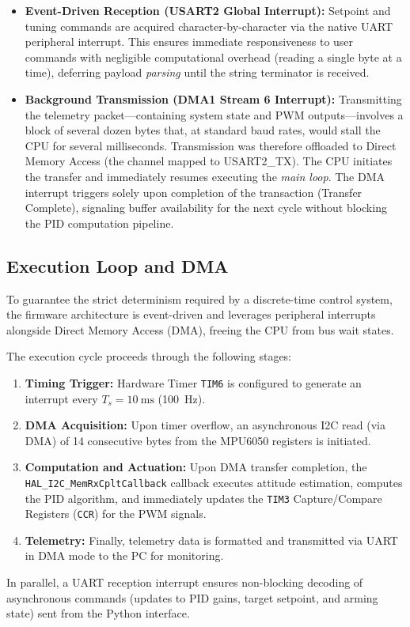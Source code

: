 \documentclass[11pt, a4paper]{article}
\begin{document}
\begin{itemize}
    \item \textbf{Event-Driven Reception (USART2 Global Interrupt):} Setpoint and tuning commands are acquired character-by-character via the native UART peripheral interrupt. This ensures immediate responsiveness to user commands with negligible computational overhead (reading a single byte at a time), deferring payload \textit{parsing} until the string terminator is received.
    \item \textbf{Background Transmission (DMA1 Stream 6 Interrupt):} Transmitting the telemetry packet—containing system state and PWM outputs—involves a block of several dozen bytes that, at standard baud rates, would stall the CPU for several milliseconds. Transmission was therefore offloaded to Direct Memory Access (the channel mapped to USART2\_TX). The CPU initiates the transfer and immediately resumes executing the \textit{main loop}. The DMA interrupt triggers solely upon completion of the transaction (Transfer Complete), signaling buffer availability for the next cycle without blocking the PID computation pipeline.
\end{itemize}

\subsection{Execution Loop and DMA}
To guarantee the strict determinism required by a discrete-time control system, the firmware architecture is event-driven and leverages peripheral interrupts alongside Direct Memory Access (DMA), freeing the CPU from bus wait states.

The execution cycle proceeds through the following stages:
\begin{enumerate}
    \item \textbf{Timing Trigger:} Hardware Timer \texttt{TIM6} is configured to generate an interrupt every $T_s = \SI{10}{\milli\second}$ (\SI{100}{\hertz}).
    \item \textbf{DMA Acquisition:} Upon timer overflow, an asynchronous I2C read (via DMA) of 14 consecutive bytes from the MPU6050 registers is initiated.
    \item \textbf{Computation and Actuation:} Upon DMA transfer completion, the \texttt{HAL\_I2C\allowbreak{}\_MemRxCpltCallback} callback executes attitude estimation, computes the PID algorithm, and immediately updates the \texttt{TIM3} Capture/Compare Registers (\texttt{CCR}) for the PWM signals.
    \item \textbf{Telemetry:} Finally, telemetry data is formatted and transmitted via UART in DMA mode to the PC for monitoring.
\end{enumerate}
In parallel, a UART reception interrupt ensures non-blocking decoding of asynchronous commands (updates to PID gains, target setpoint, and arming state) sent from the Python interface.
\end{document}

